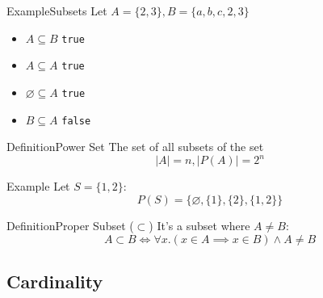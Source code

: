 \documentclass{MathNotes}
\newenvironment{example}[1]{\begin{BlueBox}{Example}{#1}}{\end{BlueBox}}
\newenvironment{definition}[1]{\begin{RedBox}{Definition}{#1}}{\end{RedBox}}
\begin{document}
\begin{example}{Subsets}\label{ex:subsets}
	Let $A=\{2,3\},B=\{a,b,c,2,3\}$\newline
	\begin{multicols}{2}
		\begin{itemize}
			\item $A\subseteq B$  \texttt{true}\\
			\item $A\subseteq A$  \texttt{true}\\
			\item $\varnothing\subseteq A$  \texttt{true}\\
			\item $B\subseteq A$  \texttt{false}\\
		\end{itemize}
	\end{multicols}
\end{example}

\begin{multicols}{2}
	\begin{definition}{Power Set}\label{def:power-set}
		The set of all subsets of the set\[\bigl|A\bigr|=n,\bigl|P(A)\bigr|=2^n\]
	\end{definition}

	\begin{example}{}\label{ex:power-set}
		Let $S=\{1,2\}$:\[P(S)=\bigl\{\varnothing,\{1\},\{2\},\{1,2\}\bigr\}\]
	\end{example}
\end{multicols}

\begin{definition}{Proper Subset ($\subset$)}
	It's a subset where $A\neq B$: \[A\subset B\iff\forall x.(x\in A\implies x\in B)\land A\neq B\]
\end{definition}

\subsection{Cardinality}\label{sec:cardinality}
\end{document}
